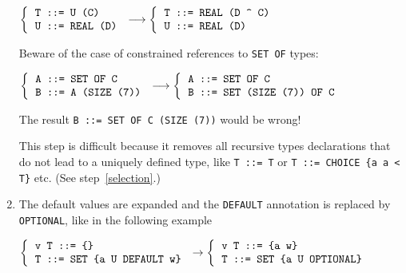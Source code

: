 \begin{enumerate}
        \begin{center}
        {\small
         $\left\{
             \begin{tabular}{l}
                \verb+T ::= U (C)+\\
                \verb+U ::= REAL (D)+
             \end{tabular}
          \right.
          \longrightarrow
          \left\{
             \begin{tabular}{l}
                \verb+T ::= REAL (D ^ C)+\\
                \verb+U ::= REAL (D)+
             \end{tabular}
          \right.$}
        \end{center}

Beware of the case of constrained references
        to \texttt{\small SET OF} types:

        \begin{center}
        {\small
         $\left\{
            \begin{tabular}{l}
              \verb+A ::= SET OF C+\\
              \verb+B ::= A (SIZE (7))+
            \end{tabular}
          \right.
          \longrightarrow
          \left\{
            \begin{tabular}{l}
              \verb+A ::= SET OF C+\\ 
              \verb+B ::= SET (SIZE (7)) OF C+
            \end{tabular}
          \right.$}
        \end{center}

       The result {\small \verb+B ::= SET OF C (SIZE (7))+} would be
       wrong!

       This step is difficult because it removes all recursive types
       declarations that do not lead to a uniquely defined type, like
       \texttt{\small T ::= T} or {\small
       \verb+T ::= CHOICE {a a < T}+} etc. (See step~\ref{selection}.)

  \item The default values are expanded and the \texttt{DEFAULT}
  annotation is replaced by \texttt{OPTIONAL}, like in the following
  example

        \begin{center}
        {\small
         $\left\{
            \begin{tabular}{l}
               \verb+v T ::= {}+\\
               \verb+T ::= SET {a U DEFAULT w}+
            \end{tabular}
          \right.
          \rightarrow
          \left\{
             \begin{tabular}{l}
               \verb+v T ::= {a w}+\\
               \verb+T ::= SET {a U OPTIONAL}+
             \end{tabular}
           \right.$}
        \end{center}


\end{enumerate}
